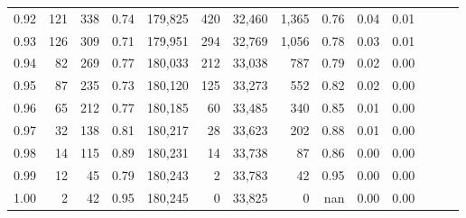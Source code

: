\begin{tabular}{rrrrrrrrrrrrrr}
0.92 &    121 &  338 &  0.74 &  179,825 &      420 &  32,460 &   1,365 &  0.76 &  0.04 &      0.01 \\
0.93 &    126 &  309 &  0.71 &  179,951 &      294 &  32,769 &   1,056 &  0.78 &  0.03 &      0.01 \\
0.94 &     82 &  269 &  0.77 &  180,033 &      212 &  33,038 &     787 &  0.79 &  0.02 &      0.00 \\
0.95 &     87 &  235 &  0.73 &  180,120 &      125 &  33,273 &     552 &  0.82 &  0.02 &      0.00 \\
0.96 &     65 &  212 &  0.77 &  180,185 &       60 &  33,485 &     340 &  0.85 &  0.01 &      0.00 \\
0.97 &     32 &  138 &  0.81 &  180,217 &       28 &  33,623 &     202 &  0.88 &  0.01 &      0.00 \\
0.98 &     14 &  115 &  0.89 &  180,231 &       14 &  33,738 &      87 &  0.86 &  0.00 &      0.00 \\
0.99 &     12 &   45 &  0.79 &  180,243 &        2 &  33,783 &      42 &  0.95 &  0.00 &      0.00 \\
1.00 &      2 &   42 &  0.95 &  180,245 &        0 &  33,825 &       0 &   nan &  0.00 &      0.00 \\
\bottomrule
\end{tabular}
